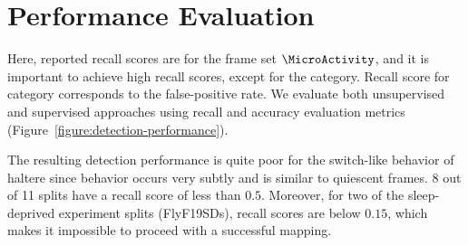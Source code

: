 \section{Performance Evaluation}\label{section:performance-evaluation}
Here, reported recall scores are for the frame set $\MicroActivity$, and it is important to achieve high recall scores, except for the \QuiescentOther category.
Recall score for \QuiescentOther category corresponds to the false-positive rate.
We evaluate both unsupervised and supervised approaches using recall and accuracy evaluation metrics (Figure~\ref{figure:detection-performance}).

The resulting detection performance is quite poor for the switch-like behavior of haltere since \HaltereSwitch behavior occurs very subtly and is similar to quiescent frames.
8 out of 11 splits have a \HaltereSwitch recall score of less than $0.5$.
Moreover, for two of the sleep-deprived experiment splits (FlyF19SDs), \ProboscisPumping recall scores are below $0.15$, which makes it impossible to proceed with a successful mapping.

